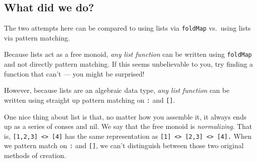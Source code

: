\documentclass[]{article}
\newenvironment{Shaded}{}{}
\newcommand{\DataTypeTok}[1]{\textcolor[rgb]{0.56,0.13,0.00}{#1}}
\newcommand{\DecValTok}[1]{\textcolor[rgb]{0.25,0.63,0.44}{#1}}
\newcommand{\FunctionTok}[1]{\textcolor[rgb]{0.02,0.16,0.49}{#1}}
\newcommand{\NormalTok}[1]{#1}
\newcommand{\StringTok}[1]{\textcolor[rgb]{0.25,0.44,0.63}{#1}}
\begin{document}
\begin{Shaded}
\end{Shaded}

\hypertarget{what-did-we-do}{%
\subsection{What did we do?}\label{what-did-we-do}}

The two attempts here can be compared to using lists via \texttt{foldMap}
vs.~using lists via pattern matching.

Because lists act as a free monoid, \emph{any list function} can be written
using \texttt{foldMap} and not directly pattern matching. If this seems
unbelievable to you, try finding a function that can't --- you might be
surprised!

However, because lists are an algebraic data type, \emph{any list function} can
be written using straight up pattern matching on \texttt{:} and \texttt{{[}{]}}.

One nice thing about list is that, no matter how you assemble it, it always ends
up as a series of conses and nil. We say that the free monoid is
\emph{normalizing}. That is,
\texttt{{[}1,2,3{]}\ \textless{}\textgreater{}\ {[}4{]}} has the same
representation as
\texttt{{[}1{]}\ \textless{}\textgreater{}\ {[}2,3{]}\ \textless{}\textgreater{}\ {[}4{]}.}
When we pattern match on \texttt{:} and \texttt{{[}{]}}, we can't distinguish
between those two original methods of creation.
\end{document}
